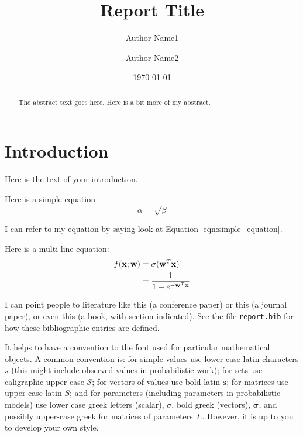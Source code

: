 \documentclass[11point]{article}
\renewcommand{\vec}[1]{\boldsymbol{\mathbf{#1}}}
\newcommand{\datapoint}{\vec{x}}
\newcommand{\weights}{\vec{w}}
\begin{document}
\title{Report Title}
\author[*]{Author Name1}
\author[**]{Author Name2}
\date{\today}

\maketitle

\begin{abstract}
The abstract text goes here. Here is a bit more of my abstract.
\end{abstract}

\section{Introduction}
\label{sec:intro}
Here is the text of your introduction.

Here is a simple equation
\begin{equation}
    \label{eqn:simple_equation}
    \alpha = \sqrt{ \beta }
\end{equation}

I can refer to my equation by saying look at Equation \eqref{eqn:simple_equation}.

Here is a multi-line equation:
\begin{align}
f(\datapoint; \weights)
& = \sigma(\weights^T\datapoint)
\label{eqn:logistic_regresion_decision_function} %
\\ %
& = \frac{1}{1+e^{-\weights^T\datapoint}}
\notag %
\end{align}

I can point people to literature like this \cite{Mikolov2013} (a conference paper) or this \cite{Fawcett2006} (a journal paper), or even this \cite[Sec. 4.1]{Bishop2006} (a book, with section indicated). See the file \texttt{report.bib} for how these bibliographic entries are defined.

It helps to have a convention to the font used for particular mathematical objects. A common convention is: for simple values use lower case latin characters $s$ (this might include observed values in probabilistic work); for sets use caligraphic upper case $\mathcal{S}$; for vectors of values use bold latin $\vec{s}$; for matrices use upper case latin $S$; and for parameters (including parameters in probabilistic models) use lower case greek letters (scalar), $\sigma$, bold greek (vectors), $\vec{\sigma}$, and possibly upper-case greek for matrices of parameters $\Sigma$. However, it is up to you to develop your own style.
\end{document}
